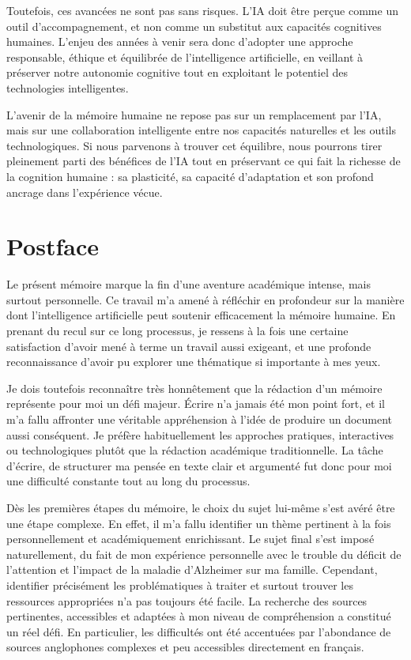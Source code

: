 \documentclass[11pt,a4paper]{report}
\begin{document}
Toutefois, ces avancées ne sont pas sans risques. L’IA doit être perçue comme un outil d’accompagnement, et non comme un substitut aux capacités cognitives humaines. L’enjeu des années à venir sera donc d’adopter une approche responsable, éthique et équilibrée de l’intelligence artificielle, en veillant à préserver notre autonomie cognitive tout en exploitant le potentiel des technologies intelligentes.

L’avenir de la mémoire humaine ne repose pas sur un remplacement par l’IA, mais sur une collaboration intelligente entre nos capacités naturelles et les outils technologiques. Si nous parvenons à trouver cet équilibre, nous pourrons tirer pleinement parti des bénéfices de l’IA tout en préservant ce qui fait la richesse de la cognition humaine : sa plasticité, sa capacité d’adaptation et son profond ancrage dans l’expérience vécue.

\chapter*{Postface}

Le présent mémoire marque la fin d’une aventure académique intense, mais surtout personnelle. Ce travail m’a amené à réfléchir en profondeur sur la manière dont l’intelligence artificielle peut soutenir efficacement la mémoire humaine. En prenant du recul sur ce long processus, je ressens à la fois une certaine satisfaction d’avoir mené à terme un travail aussi exigeant, et une profonde reconnaissance d’avoir pu explorer une thématique si importante à mes yeux.

Je dois toutefois reconnaître très honnêtement que la rédaction d’un mémoire représente pour moi un défi majeur. Écrire n’a jamais été mon point fort, et il m’a fallu affronter une véritable appréhension à l’idée de produire un document aussi conséquent. Je préfère habituellement les approches pratiques, interactives ou technologiques plutôt que la rédaction académique traditionnelle. La tâche d’écrire, de structurer ma pensée en texte clair et argumenté fut donc pour moi une difficulté constante tout au long du processus.

Dès les premières étapes du mémoire, le choix du sujet lui-même s’est avéré être une étape complexe. En effet, il m’a fallu identifier un thème pertinent à la fois personnellement et académiquement enrichissant. Le sujet final s’est imposé naturellement, du fait de mon expérience personnelle avec le trouble du déficit de l’attention et l’impact de la maladie d’Alzheimer sur ma famille. Cependant, identifier précisément les problématiques à traiter et surtout trouver les ressources appropriées n’a pas toujours été facile. La recherche des sources pertinentes, accessibles et adaptées à mon niveau de compréhension a constitué un réel défi. En particulier, les difficultés ont été accentuées par l’abondance de sources anglophones complexes et peu accessibles directement en français.
\end{document}
